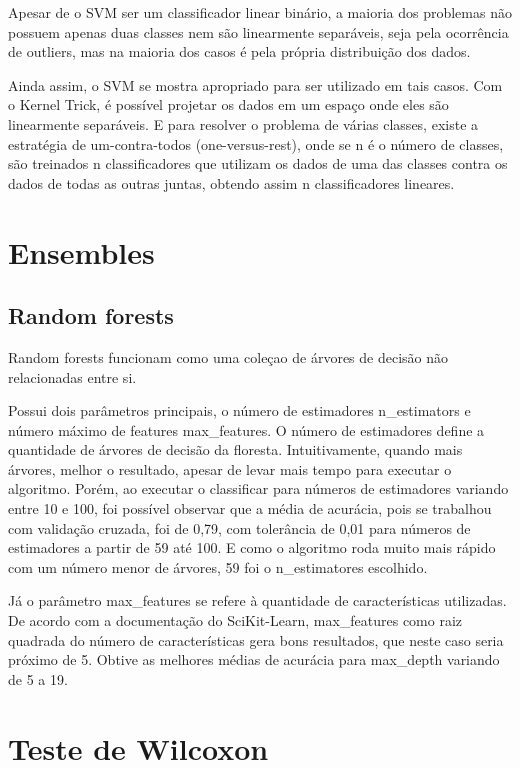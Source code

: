 \documentclass[conference]{IEEEtran}
\begin{document}
Apesar de o SVM ser um classificador linear binário, a maioria dos
problemas não possuem apenas duas classes nem são linearmente separáveis, seja
pela ocorrência de outliers, mas na maioria dos casos é pela própria
distribuição dos dados.

Ainda assim, o SVM se mostra apropriado para ser utilizado em tais casos. Com o
Kernel Trick, é possível projetar os dados em um espaço onde eles são
linearmente separáveis. E para resolver o problema de várias classes, existe a
estratégia de um-contra-todos (one-versus-rest), onde se n é o número de
classes, são treinados n classificadores que utilizam os dados de uma das
classes contra os dados de todas as outras juntas, obtendo assim n
classificadores lineares.


\section{Ensembles}

\subsection{Random forests}

Random forests funcionam como uma coleçao de árvores de decisão não
relacionadas entre si.

Possui dois parâmetros principais, o número de estimadores n\_estimators e
número máximo de features max\_features. O número de estimadores define a
quantidade de árvores de decisão da floresta. Intuitivamente, quando mais
árvores, melhor o resultado, apesar de levar mais tempo para executar o
algoritmo. Porém, ao executar o classificar para números de estimadores
variando entre 10 e 100, foi possível observar que a média de acurácia, pois se
trabalhou com validação cruzada, foi de 0,79, com tolerância de 0,01 para
números de estimadores a partir de 59 até 100. E como o algoritmo roda muito
mais rápido com um número menor de árvores, 59 foi o n\_estimatores escolhido.

Já o parâmetro max\_features se refere à quantidade de características
utilizadas. De acordo com a documentação do SciKit-Learn, max\_features como
raiz quadrada do número de características gera bons resultados, que neste caso
seria próximo de 5. Obtive as melhores médias de acurácia para max\_depth
variando de 5 a 19.

\section{Teste de Wilcoxon}
\end{document}
